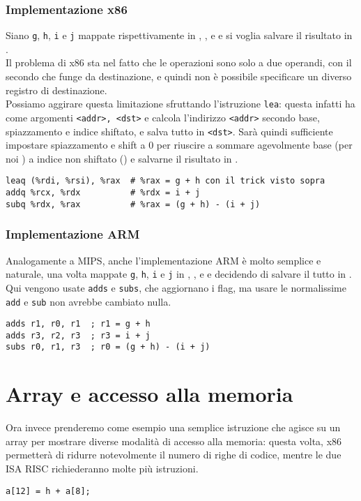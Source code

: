 \documentclass[class=book, crop=false, oneside]{standalone}
\begin{document}
\subsubsection{Implementazione x86}
Siano \texttt{g}, \texttt{h}, \texttt{i} e \texttt{j} mappate rispettivamente in , ,  e  e si voglia salvare il risultato in .\\
Il problema di x86 sta nel fatto che le operazioni sono solo a due operandi, con il secondo che funge da destinazione, e quindi non è possibile specificare un diverso registro di destinazione.\\
Possiamo aggirare questa limitazione sfruttando l'istruzione \texttt{lea}: questa infatti ha come argomenti \texttt{<addr>, <dst>} e calcola l'indirizzo \texttt{<addr>} secondo base, spiazzamento e indice shiftato, e salva tutto in \texttt{<dst>}. Sarà quindi sufficiente impostare spiazzamento e shift a 0 per riuscire a sommare agevolmente base (per noi ) a indice non shiftato () e salvarne il risultato in .
\begin{verbatim}
leaq (%rdi, %rsi), %rax  # %rax = g + h con il trick visto sopra
addq %rcx, %rdx          # %rdx = i + j
subq %rdx, %rax          # %rax = (g + h) - (i + j)
\end{verbatim}

\subsubsection{Implementazione ARM}
Analogamente a MIPS, anche l'implementazione ARM è molto semplice e naturale, una volta mappate \texttt{g}, \texttt{h}, \texttt{i} e \texttt{j} in , ,  e  e decidendo di salvare il tutto in .\\
Qui vengono usate \texttt{adds} e \texttt{subs}, che aggiornano i flag, ma usare le normalissime \texttt{add} e \texttt{sub} non avrebbe cambiato nulla.
\begin{verbatim}
adds r1, r0, r1  ; r1 = g + h
adds r3, r2, r3  ; r3 = i + j
subs r0, r1, r3  ; r0 = (g + h) - (i + j)
\end{verbatim}

\section{Array e accesso alla memoria}
Ora invece prenderemo come esempio una semplice istruzione che agisce su un array per mostrare diverse modalità di accesso alla memoria: questa volta, x86 permetterà di ridurre notevolmente il numero di righe di codice, mentre le due ISA RISC richiederanno molte più istruzioni.
\begin{verbatim}
a[12] = h + a[8];
\end{verbatim}
\end{document}
